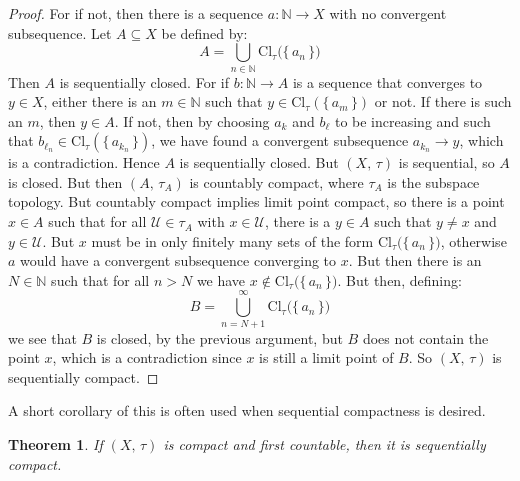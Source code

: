 \documentclass{article}
\theoremstyle{plain}
\newtheorem{theorem}{Theorem}[section]
\theoremstyle{normal}
\begin{document}
        \begin{proof}
            For if not, then there is a sequence $a:\mathbb{N}\rightarrow{X}$
            with no convergent subsequence. Let $A\subseteq{X}$ be defined by:
            \begin{equation}
                A=\bigcup_{n\in\mathbb{N}}
                    \textrm{Cl}_{\tau}\big(\{\,a_{n}\,\}\big)
            \end{equation}
            Then $A$ is sequentially closed. For if
            $b:\mathbb{N}\rightarrow{A}$ is a sequence that converges to
            $y\in{X}$, either there is an $m\in\mathbb{N}$ such that
            $y\in\textrm{Cl}_{\tau}(\{\,a_{m}\,\})$ or not. If there is
            such an $m$, then $y\in{A}$. If not, then by choosing
            $a_{k}$ and $b_{\ell}$ to be increasing and such that
            $b_{\ell_{n}}\in\textrm{Cl}_{\tau}(\{\,a_{k_{n}}\,\})$, we have
            found a convergent subsequence $a_{k_{n}}\rightarrow{y}$, which is
            a contradiction. Hence $A$ is sequentially closed. But
            $(X,\,\tau)$ is sequential, so $A$ is closed. But then
            $(A,\,\tau_{A})$ is countably compact, where $\tau_{A}$ is the
            subspace topology. But countably compact implies limit point
            compact, so there is a point $x\in{A}$ such that for all
            $\mathcal{U}\in\tau_{A}$ with $x\in\mathcal{U}$, there is a
            $y\in{A}$ such that $y\ne{x}$ and $y\in\mathcal{U}$. But
            $x$ must be in only finitely many sets of the form
            $\textrm{Cl}_{\tau}\big(\{\,a_{n}\,\}\big)$, otherwise
            $a$ would have a convergent subsequence converging to $x$.
            But then there is an $N\in\mathbb{N}$ such that for all
            $n>N$ we have $x\notin\textrm{Cl}_{\tau}\big(\{\,a_{n}\,\}\big)$.
            But then, defining:
            \begin{equation}
                B=\bigcup_{n=N+1}^{\infty}
                    \textrm{Cl}_{\tau}\big(\{\,a_{n}\,\}\big)
            \end{equation}
            we see that $B$ is closed, by the previous argument, but $B$
            does not contain the point $x$, which is a contradiction since
            $x$ is still a limit point of $B$. So $(X,\,\tau)$ is
            sequentially compact.
        \end{proof}
        A short corollary of this is often used when sequential compactness is
        desired.
        \begin{theorem}
            If $(X,\,\tau)$ is compact and first countable, then it is
            sequentially compact.
        \end{theorem}
\end{document}
